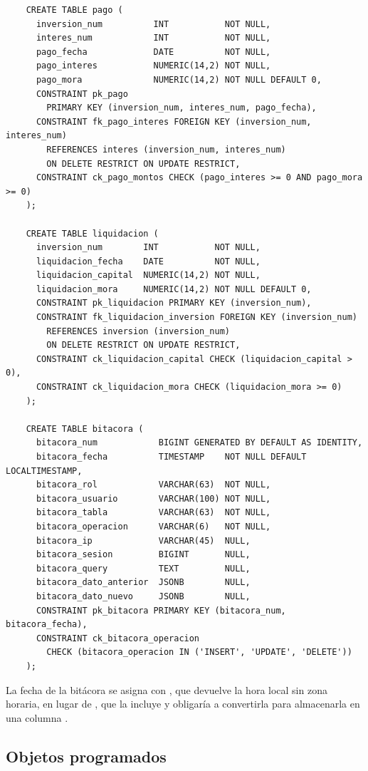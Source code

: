 \begin{verbatim}
	CREATE TABLE pago (
	  inversion_num          INT           NOT NULL,
	  interes_num            INT           NOT NULL,
	  pago_fecha             DATE          NOT NULL,
	  pago_interes           NUMERIC(14,2) NOT NULL,
	  pago_mora              NUMERIC(14,2) NOT NULL DEFAULT 0,
	  CONSTRAINT pk_pago
	    PRIMARY KEY (inversion_num, interes_num, pago_fecha),
	  CONSTRAINT fk_pago_interes FOREIGN KEY (inversion_num, interes_num)
	    REFERENCES interes (inversion_num, interes_num)
	    ON DELETE RESTRICT ON UPDATE RESTRICT,
	  CONSTRAINT ck_pago_montos CHECK (pago_interes >= 0 AND pago_mora >= 0)
	);

	CREATE TABLE liquidacion (
	  inversion_num        INT           NOT NULL,
	  liquidacion_fecha    DATE          NOT NULL,
	  liquidacion_capital  NUMERIC(14,2) NOT NULL,
	  liquidacion_mora     NUMERIC(14,2) NOT NULL DEFAULT 0,
	  CONSTRAINT pk_liquidacion PRIMARY KEY (inversion_num),
	  CONSTRAINT fk_liquidacion_inversion FOREIGN KEY (inversion_num)
	    REFERENCES inversion (inversion_num)
	    ON DELETE RESTRICT ON UPDATE RESTRICT,
	  CONSTRAINT ck_liquidacion_capital CHECK (liquidacion_capital > 0),
	  CONSTRAINT ck_liquidacion_mora CHECK (liquidacion_mora >= 0)
	);

	CREATE TABLE bitacora (
	  bitacora_num            BIGINT GENERATED BY DEFAULT AS IDENTITY,
	  bitacora_fecha          TIMESTAMP    NOT NULL DEFAULT LOCALTIMESTAMP,
	  bitacora_rol            VARCHAR(63)  NOT NULL,
	  bitacora_usuario        VARCHAR(100) NOT NULL,
	  bitacora_tabla          VARCHAR(63)  NOT NULL,
	  bitacora_operacion      VARCHAR(6)   NOT NULL,
	  bitacora_ip             VARCHAR(45)  NULL,
	  bitacora_sesion         BIGINT       NULL,
	  bitacora_query          TEXT         NULL,
	  bitacora_dato_anterior  JSONB        NULL,
	  bitacora_dato_nuevo     JSONB        NULL,
	  CONSTRAINT pk_bitacora PRIMARY KEY (bitacora_num, bitacora_fecha),
	  CONSTRAINT ck_bitacora_operacion
	    CHECK (bitacora_operacion IN ('INSERT', 'UPDATE', 'DELETE'))
	);
\end{verbatim}

La fecha de la bitácora se asigna con , que devuelve la hora local sin zona horaria, en lugar de , que la incluye y obligaría a convertirla para almacenarla en una columna .

\subsection{Objetos programados}

